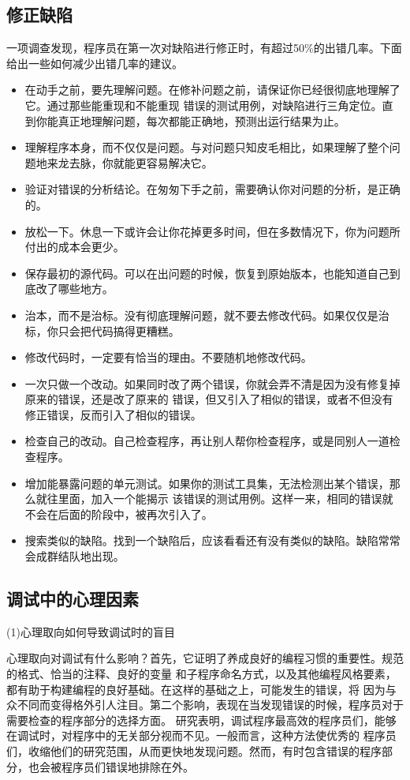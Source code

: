 \documentclass{article}
\begin{document}
\subsection{修正缺陷}
一项调查发现，程序员在第一次对缺陷进行修正时，有超过50\%的出错几率。下面给出一些如何减少出错几率的建议。
\begin{itemize}
    \item 在动手之前，要先理解问题。在修补问题之前，请保证你已经很彻底地理解了它。通过那些能重现和不能重现
    错误的测试用例，对缺陷进行三角定位。直到你能真正地理解问题，每次都能正确地，预测出运行结果为止。
    \item 理解程序本身，而不仅仅是问题。与对问题只知皮毛相比，如果理解了整个问题地来龙去脉，你就能更容易解决它。
    \item 验证对错误的分析结论。在匆匆下手之前，需要确认你对问题的分析，是正确的。
    \item 放松一下。休息一下或许会让你花掉更多时间，但在多数情况下，你为问题所付出的成本会更少。
    \item 保存最初的源代码。可以在出问题的时候，恢复到原始版本，也能知道自己到底改了哪些地方。
    \item 治本，而不是治标。没有彻底理解问题，就不要去修改代码。如果仅仅是治标，你只会把代码搞得更糟糕。
    \item 修改代码时，一定要有恰当的理由。不要随机地修改代码。
    \item 一次只做一个改动。如果同时改了两个错误，你就会弄不清是因为没有修复掉原来的错误，还是改了原来的
    错误，但又引入了相似的错误，或者不但没有修正错误，反而引入了相似的错误。
    \item 检查自己的改动。自己检查程序，再让别人帮你检查程序，或是同别人一道检查程序。
    \item 增加能暴露问题的单元测试。如果你的测试工具集，无法检测出某个错误，那么就往里面，加入一个能揭示
    该错误的测试用例。这样一来，相同的错误就不会在后面的阶段中，被再次引入了。
    \item 搜索类似的缺陷。找到一个缺陷后，应该看看还有没有类似的缺陷。缺陷常常会成群结队地出现。
\end{itemize}

\subsection{调试中的心理因素}
\par
(1)心理取向如何导致调试时的盲目
\par
心理取向对调试有什么影响？首先，它证明了养成良好的编程习惯的重要性。规范的格式、恰当的注释、良好的变量
和子程序命名方式，以及其他编程风格要素，都有助于构建编程的良好基础。在这样的基础之上，可能发生的错误，将
因为与众不同而变得格外引人注目。第二个影响，表现在当发现错误的时候，程序员对于需要检查的程序部分的选择方面。
研究表明，调试程序最高效的程序员们，能够在调试时，对程序中的无关部分视而不见。一般而言，这种方法使优秀的
程序员们，收缩他们的研究范围，从而更快地发现问题。然而，有时包含错误的程序部分，也会被程序员们错误地排除在外。
\end{document}
